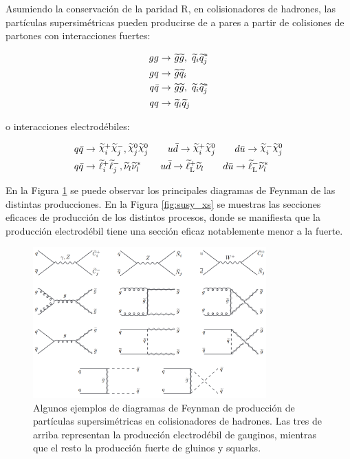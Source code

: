 Asumiendo la conservación de la paridad R, en colisionadores de hadrones, las partículas supersimétricas pueden producirse de a pares a partir de colisiones de partones con interacciones fuertes:

\begin{equation}
	\begin{split}
		gg\to &\ \widetilde{g}\widetilde{g},\ \widetilde{q}_i\widetilde{q}_j^* \\ 
		gq\to &\ \widetilde{g}\widetilde{q}_i \\ 
		q\bar{q}\to &\ \widetilde{g}\widetilde{g},\ \widetilde{q}_i\widetilde{q}_j^* \\ 
		qq\to &\ \widetilde{q}_i\widetilde{q}_j \\ 
	\end{split}
\end{equation}

\noindent
o interacciones electrodébiles:

\begin{equation}
	\begin{split}
		q\bar{q}\to &\ \ggino_i^+\ggino_j^-,\ggino_j^0\ggino_j^0 \quad\quad u\bar{d}\to\ggino_i^+\ggino_j^0 \quad\quad d\bar{u}\to\ggino_i^-\ggino_j^0 \\
		q\bar{q}\to &\ \slepton_i^{+}\slepton_j^{-},\snu_l\snu_l^* \quad\quad u\bar{d}\to\sleptonL^{+}\snu_l \quad\quad d\bar{u}\to\sleptonL^{-}\snu_l^* \\
	\end{split}
\end{equation}

En la Figura \ref{fig:sp_production} se puede observar los principales diagramas de Feynman de las distintas producciones. En la Figura \ref{fig:susy_xs} se muestras las secciones eficaces de producción de los distintos procesos, donde se manifiesta que la producción electrodébil tiene una sección eficaz notablemente menor a la fuerte.

\begin{figure}
  \centering
  \includegraphics[width=0.8\textwidth]{images/theory/sp_production.png}
  \caption{Algunos ejemplos de diagramas de Feynman de producción de partículas supersimétricas en colisionadores de hadrones. Las tres de arriba representan la producción electrodébil de gauginos, mientras que el resto la producción fuerte de gluinos y squarks.}
  \label{fig:sp_production}
\end{figure}

